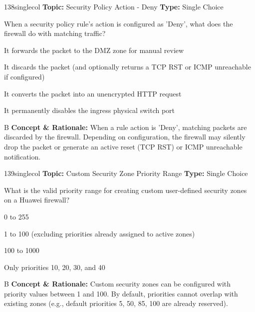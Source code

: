 \begin{qcard}{138}{singlecol}
\textcolor{darkslate!75}{\small\textbf{Topic:} Security Policy Action - Deny \hfill \textbf{Type:} Single Choice}\vspace{0.4em}\par
When a security policy rule's action is configured as 'Deny', what does the firewall do with matching traffic?
\begin{qoptions}
\item It forwards the packet to the DMZ zone for manual review
\item It discards the packet (and optionally returns a TCP RST or ICMP unreachable if configured)
\item It converts the packet into an unencrypted HTTP request
\item It permanently disables the ingress physical switch port
\end{qoptions}
\end{qcard}
\nopagebreak
\begin{explainbox}{B}
\textbf{Concept \& Rationale:} When a rule action is 'Deny', matching packets are discarded by the firewall. Depending on configuration, the firewall may silently drop the packet or generate an active reset (TCP RST) or ICMP unreachable notification.
\end{explainbox}

\begin{qcard}{139}{singlecol}
\textcolor{darkslate!75}{\small\textbf{Topic:} Custom Security Zone Priority Range \hfill \textbf{Type:} Single Choice}\vspace{0.4em}\par
What is the valid priority range for creating custom user-defined security zones on a Huawei firewall?
\begin{qoptions}
\item 0 to 255
\item 1 to 100 (excluding priorities already assigned to active zones)
\item 100 to 1000
\item Only priorities 10, 20, 30, and 40
\end{qoptions}
\end{qcard}
\nopagebreak
\begin{explainbox}{B}
\textbf{Concept \& Rationale:} Custom security zones can be configured with priority values between 1 and 100. By default, priorities cannot overlap with existing zones (e.g., default priorities 5, 50, 85, 100 are already reserved).
\end{explainbox}

